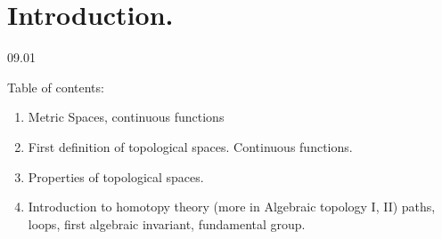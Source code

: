 \section{Introduction.}
09.01

Table of contents:

\begin{enumerate}
  \item Metric Spaces, continuous functions
  \item First definition of topological spaces. Continuous functions.
  \item Properties of topological spaces.
  \item Introduction to homotopy theory (more in Algebraic topology I, II)
    \subitem paths, loops, first algebraic invariant, fundamental group.
\end{enumerate}

